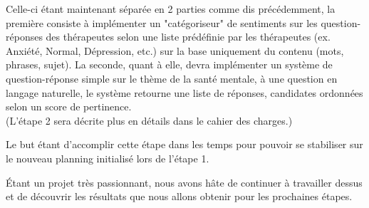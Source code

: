 \documentclass[12pt,a4paper]{article}
\begin{document}
Celle-ci étant maintenant séparée en 2 parties comme dis précédemment, la première consiste à implémenter un "catégoriseur" 
de sentiments sur les question-réponses des thérapeutes selon une liste prédéfinie par les thérapeutes 
(ex. Anxiété, Normal, Dépression, etc.) sur la base uniquement du contenu (mots, phrases, sujet).
La seconde, quant à elle, devra implémenter un système de question-réponse simple sur le thème de la santé mentale, à une question en langage naturelle,
le système retourne une liste de réponses, candidates ordonnées selon un score de pertinence.\\
(L'étape 2 sera décrite plus en détails dans le cahier des charges.)

Le but étant d'accomplir cette étape dans les temps pour pouvoir se stabiliser sur le nouveau planning initialisé lors de l'étape 1.

Étant un projet très passionnant, nous avons hâte de continuer à travailler dessus et de découvrir les résultats que nous allons obtenir pour les prochaines étapes.

\pagebreak
\end{document}
